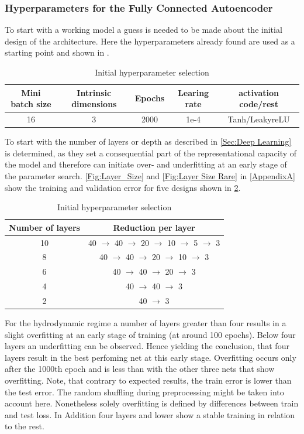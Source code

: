 \documentclass[12pt, a4paper]{article}
\begin{document}
\subsubsection{Hyperparameters for the Fully Connected Autoencoder}\label{Fully Connected}
To start with a working model a guess is needed to be made about the initial design of the architecture. Here the hyperparameters already found are used as a starting point and shown in .\\
\begin{table}[!htbp]\centering
	\begin{tabular}{ |c|c|c|c|c| }
		\hline
		Mini batch size & Intrinsic dimensions& Epochs & Learing rate & activation code/rest\\ [.5ex]
		\hline
		16 & 3 & 2000& 1e-4 & Tanh/LeakyreLU\\ \hline
	\end{tabular}
	\caption{Initial hyperparameter selection}
	\label{Tab:First Guess}
\end{table}
To start with the number of layers or depth as described in \cref{Sec:Deep Learning} is determined, as they set a consequential part of the representational capacity of the model and therefore can initiate over- and underfitting at an early stage of the parameter search. \cref{Fig:Layer_Size} and \cref{Fig:Layer Size Rare} in \cref{AppendixA} show the training and validation error for five designs shown in \cref{Tab:Layer Size}.\\
\begin{table}[!htbp]\centering
	\begin{tabular}{ |c|c| }
		\hline
		Number of layers & Reduction per layer \\ [.5ex]
		\hline
		10 & 40 \(\rightarrow\) 40 \(\rightarrow\) 20  \(\rightarrow\) 10 \(\rightarrow\) 5 \(\rightarrow\) 3\\ \hline
		8 & 40 \(\rightarrow\) 40 \(\rightarrow\) 20  \(\rightarrow\) 10 \(\rightarrow\) 3\\ \hline
		6 & 40 \(\rightarrow\) 40 \(\rightarrow\) 20  \(\rightarrow\) 3\\ \hline
		4 & 40 \(\rightarrow\) 40 \(\rightarrow\) 3\\ \hline
		2 & 40 \(\rightarrow\) 3\\ \hline
	\end{tabular}
	\caption{Initial hyperparameter selection}
	\label{Tab:Layer Size}
\end{table}
For the hydrodynamic regime a number of layers greater than four results in a slight overfitting at an early stage of training (at around 100 epochs). Below four layers an underfitting can be observed. Hence yielding the conclusion, that four layers result in the best perfoming net at this early stage. Overfitting occurs only after the 1000th epoch and is less than with the other three nets that show overfitting. Note, that contrary to expected results, the train error is lower than the test error. The random shuffling during preprocessing might be taken into account here. Nonetheless solely overfitting is defined by differences between train and test loss. In Addition four layers and lower show a stable training in relation to the rest.\\
\end{document}
